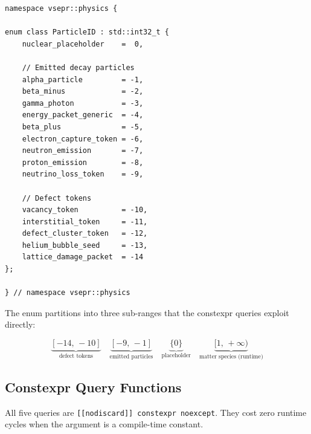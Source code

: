 \documentclass[11pt,a4paper]{article}
\begin{document}
\begin{lstlisting}[style=cpp20, caption={\texttt{include/physics/particle\_id.hpp} --- enum definition}]
namespace vsepr::physics {

enum class ParticleID : std::int32_t {
    nuclear_placeholder    =  0,

    // Emitted decay particles
    alpha_particle         = -1,
    beta_minus             = -2,
    gamma_photon           = -3,
    energy_packet_generic  = -4,
    beta_plus              = -5,
    electron_capture_token = -6,
    neutron_emission       = -7,
    proton_emission        = -8,
    neutrino_loss_token    = -9,

    // Defect tokens
    vacancy_token          = -10,
    interstitial_token     = -11,
    defect_cluster_token   = -12,
    helium_bubble_seed     = -13,
    lattice_damage_packet  = -14
};

} // namespace vsepr::physics
\end{lstlisting}

The enum partitions into three sub-ranges that the constexpr queries
exploit directly:

\[
\underbrace{[-14,\,-10]}_{\text{defect tokens}}
\quad
\underbrace{[-9,\,-1]}_{\text{emitted particles}}
\quad
\underbrace{\{0\}}_{\text{placeholder}}
\quad
\underbrace{[1,\,+\infty)}_{\text{matter species (runtime)}}
\]

\subsection{Constexpr Query Functions}

All five queries are \texttt{[[nodiscard]] constexpr noexcept}. They cost
zero runtime cycles when the argument is a compile-time constant.
\end{document}
